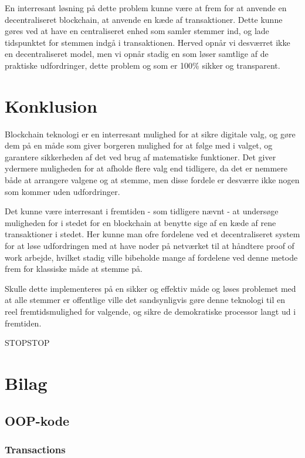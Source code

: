 \documentclass[a4paper, 8pt, oneside]{article} %
\begin{document}
En interresant løsning på dette problem kunne være at frem for at anvende en decentraliseret blockchain, at anvende en kæde af transaktioner. Dette kunne gøres ved at have en centraliseret enhed som samler stemmer ind, og lade tidspunktet for stemmen indgå i transaktionen. Herved opnår vi desværret ikke en decentraliseret model, men vi opnår stadig en som løser samtlige af de praktiske udfordringer, dette problem og som er 100\% sikker og transparent.

\section{Konklusion}
Blockchain teknologi er en interresant mulighed for at sikre digitale valg, og gøre dem på en måde som giver borgeren mulighed for at følge med i valget, og garantere sikkerheden af det ved brug af matematiske funktioner. Det giver ydermere muligheden for at afholde flere valg end tidligere, da det er nemmere både at arrangere valgene og at stemme, men disse fordele er desværre ikke nogen som kommer uden udfordringer.

Det kunne være interresant i fremtiden - som tidligere nævnt - at undersøge muligheden for i stedet for en blockchain at benytte sige af en kæde af rene transaktioner i stedet. Her kunne man ofre fordelene ved et decentraliseret system for at løse udfordringen med at have noder på netværket til at håndtere proof of work arbejde, hvilket stadig ville bibeholde mange af fordelene ved denne metode frem for klassiske måde at stemme på.

Skulle dette implementeres på en sikker og effektiv måde og løses problemet med at alle stemmer er offentlige ville det sandsynligvis gøre denne teknologi til en reel fremtidsmulighed for valgende, og sikre de demokratiske processor langt ud i fremtiden.

STOPSTOP

\newpage
\appendix
\section{Bilag}
\subsection{OOP-kode}
\subsubsection{Transactions}

\newpage
\end{document}
